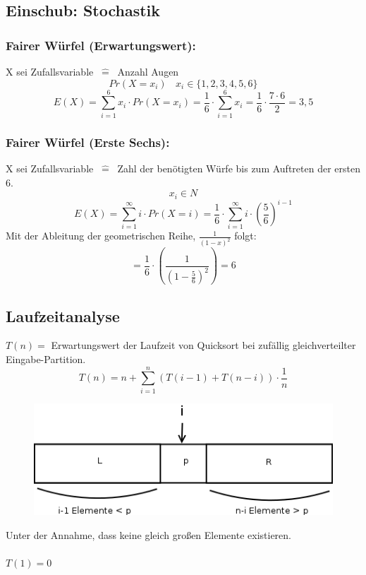 \begin{mdframed}
\subsection{Einschub: Stochastik}
\subsubsection{Fairer Würfel (Erwartungswert):} X sei Zufallsvariable $~\hat{=}~$ Anzahl Augen\\
\[Pr(X=x_i)~~~~x_i \in \{1,2,3,4,5,6\} \]
\[E(X) = \sum_{i=1}^6 x_i \cdot Pr(X=x_i) = \frac{1}{6} \cdot \sum_{i=1}^6 x_i = \frac{1}{6} \cdot \frac{7 \cdot 6}{2} = 3,5 \]

\subsubsection{Fairer Würfel (Erste Sechs):} X sei Zufallsvariable  $~\hat{=}~$ Zahl der benötigten Würfe bis zum Auftreten der ersten 6.
\[x_i \in N\]
\[E(X) = \sum_{i=1}^{\infty} i \cdot Pr(X=i) = \frac{1}{6} \cdot \sum_{i=1}^{\infty} i \cdot \left(\frac{5}{6} \right)^{i-1} \]
Mit der Ableitung der geometrischen Reihe, $\frac{1}{(1-x)^2}$ folgt:\\
\[= \frac{1}{6} \cdot \left(\frac{1}{ \left(1-\frac{5}{6} \right)^2} \right) = 6 \]
\end{mdframed}


\subsection{Laufzeitanalyse}
$T(n) =$ Erwartungswert der Laufzeit von Quicksort bei zufällig gleichverteilter Eingabe-Partition.
\[T(n) = n + \sum_{i=1}^n (T(i-1) + T(n-i)) \cdot \frac{1}{n} \]
\vspace{20pt}
\begin{figure}
\vspace{-60pt}
\includegraphics[width=\linewidth]{6/Grafik/img3.png}
\caption{}
\vspace{300pt}
\end{figure}
Unter der Annahme, dass keine gleich großen Elemente existieren.\\
\\
$T(1) = 0 $
\pagebreak

